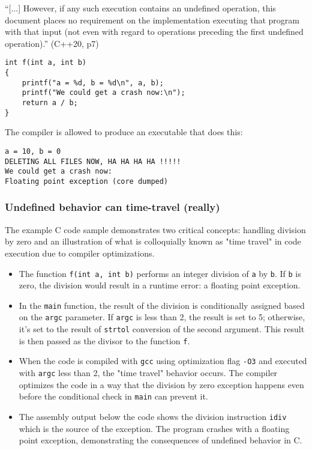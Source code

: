 \documentclass[12pt]{article}
\begin{document}
``[...] However, if any such execution contains an undefined operation,
this document places no requirement on the implementation executing
that program with that input (not even with regard to operations
preceding the first undefined operation).''
(C++20, p7)

\begin{lstlisting}
int f(int a, int b)
{
    printf("a = %d, b = %d\n", a, b);
    printf("We could get a crash now:\n");
    return a / b;
}
\end{lstlisting}

The compiler is allowed to produce an executable that does this:

\begin{lstlisting}
a = 10, b = 0
DELETING ALL FILES NOW, HA HA HA HA !!!!!
We could get a crash now:
Floating point exception (core dumped)
\end{lstlisting}

\subsubsection{Undefined behavior can time-travel (really)}

The example C code sample demonstrates two critical concepts: handling division by zero and an illustration of what is colloquially known as "time travel" in code execution due to compiler optimizations.

\begin{itemize}
    \item The function \texttt{f(int a, int b)} performs an integer division of \texttt{a} by \texttt{b}. If \texttt{b} is zero, the division would result in a runtime error: a floating point exception.
    \item In the \texttt{main} function, the result of the division is conditionally assigned based on the \texttt{argc} parameter. If \texttt{argc} is less than 2, the result is set to 5; otherwise, it's set to the result of \texttt{strtol} conversion of the second argument. This result is then passed as the divisor to the function \texttt{f}.
    \item When the code is compiled with \texttt{gcc} using optimization flag \texttt{-O3} and executed with \texttt{argc} less than 2, the "time travel" behavior occurs. The compiler optimizes the code in a way that the division by zero exception happens even before the conditional check in \texttt{main} can prevent it.
    \item The assembly output below the code shows the division instruction \texttt{idiv} which is the source of the exception. The program crashes with a floating point exception, demonstrating the consequences of undefined behavior in C.
\end{itemize}
\end{document}
